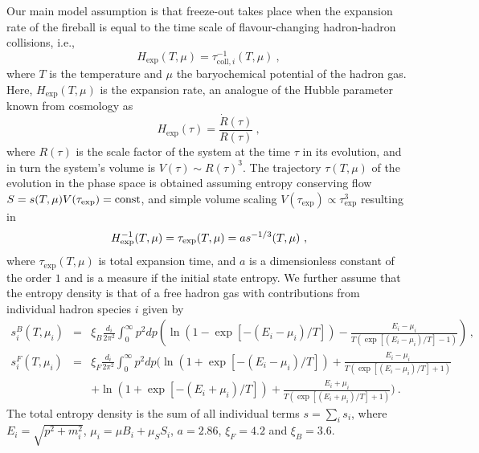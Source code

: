 \documentclass[12pt]{article}
\begin{document}
Our main model assumption is that freeze-out takes place when the expansion rate of the fireball is equal to the time scale of flavour-changing hadron-hadron collisions, i.e., 
%
\begin{equation}
H_{\text{exp}}(T,\mu)=\tau_{\text{coll},i}^{-1}(T,\mu)~,
\label{eq:Hexp}
\end{equation}
%
where $T$ is the temperature and $\mu$ the baryochemical potential of the hadron gas. 
Here, $H_{\text{exp}}(T,\mu)$ is the expansion rate, an analogue of the Hubble parameter
known from cosmology as
%
\begin{equation}
H_{\text{exp}}(\tau)= \frac{\dot{R}(\tau)}{R(\tau)}~,
\label{eq:}
\end{equation}
%
where $R(\tau)$ is the scale factor of the system at the time $\tau$ in its evolution,
and in turn the system's volume is $V(\tau)\sim R(\tau)^3$.
The trajectory $\tau(T,\mu)$ of the evolution in the phase space is obtained assuming entropy conserving flow 
$S=s(T,\mu)V(\tau_{\text{exp}})={\rm const}$,
and simple volume scaling $V(\tau_{\text{exp}})\propto \tau_{\text{exp}}^3$ resulting in
%
\begin{equation}
H^{-1}_{\rm exp}(T,\mu)=\tau_{\text{exp}}(T,\mu)=as^{-1/3}(T,\mu)~,
\label{eq:}
\end{equation}
%
where $\tau_{\text{exp}}(T,\mu)$ is total expansion time, and $a$ is a dimensionless constant of the order $1$ and is a measure if the initial state entropy. 
We further assume that the entropy density is that of a free hadron gas with contributions from individual hadron species $i$ given by
%
\begin{eqnarray}
  s^{B}_i(T,\mu_i)&=&\xi_{B}\frac{d_i}{2\pi^2}\int_{0}^{\infty}p^2dp\left(\ln(1-\exp[-(E_i-\mu_i)/T])-\frac{E_i-\mu_i}{T(\exp[(E_i-\mu_i)/T]- 1)}\right)\, ,
\\
s^{F}_i(T,\mu_i)&=&\xi_{F}\frac{d_i}{2\pi^2}\int_{0}^{\infty}p^2dp\Bigg(\ln(1+\exp[-(E_i-\mu_i)/T])+\frac{E_i-\mu_i}{T(\exp[(E_i-\mu_i)/T]+1)}
	\nonumber\\
  &&+\ln(1+\exp[-(E_i+\mu_i)/T])+\frac{E_i+\mu_i}{T(\exp[(E_i+\mu_i)/T]+1)}\Bigg)~.
\label{eq:}
\end{eqnarray}
The total entropy density is the sum of all individual terms
$s=\sum_i s_i$,
where $E_i=\sqrt{p^2+m_i^2}$, $\mu_i=\mu B_i+\mu_SS_i$, $a=2.86$, $\xi_{F}=4.2$ and $\xi_{B}=3.6$.
\end{document}
